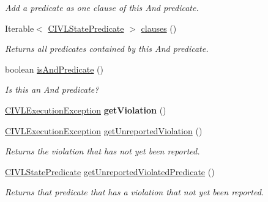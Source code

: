\begin{DoxyCompactItemize}
\begin{DoxyCompactList}\small\item\em Add a predicate as one clause of this And predicate. \end{DoxyCompactList}\item 
Iterable$<$ \hyperlink{interfaceedu_1_1udel_1_1cis_1_1vsl_1_1civl_1_1predicate_1_1IF_1_1CIVLStatePredicate}{C\+I\+V\+L\+State\+Predicate} $>$ \hyperlink{classedu_1_1udel_1_1cis_1_1vsl_1_1civl_1_1predicate_1_1common_1_1CommonAndPredicate_a1026db7b2a971331b41a0d5e1287c7d6}{clauses} ()
\begin{DoxyCompactList}\small\item\em Returns all predicates contained by this And predicate. \end{DoxyCompactList}\item 
boolean \hyperlink{classedu_1_1udel_1_1cis_1_1vsl_1_1civl_1_1predicate_1_1common_1_1CommonAndPredicate_a731ae5101c23f844402609dca417f9f3}{is\+And\+Predicate} ()
\begin{DoxyCompactList}\small\item\em Is this an And predicate? \end{DoxyCompactList}\item 
\hypertarget{classedu_1_1udel_1_1cis_1_1vsl_1_1civl_1_1predicate_1_1common_1_1CommonAndPredicate_aef11b4ccccec14cad4352d00757ed91a}{}\hyperlink{classedu_1_1udel_1_1cis_1_1vsl_1_1civl_1_1log_1_1IF_1_1CIVLExecutionException}{C\+I\+V\+L\+Execution\+Exception} {\bfseries get\+Violation} ()\label{classedu_1_1udel_1_1cis_1_1vsl_1_1civl_1_1predicate_1_1common_1_1CommonAndPredicate_aef11b4ccccec14cad4352d00757ed91a}

\item 
\hyperlink{classedu_1_1udel_1_1cis_1_1vsl_1_1civl_1_1log_1_1IF_1_1CIVLExecutionException}{C\+I\+V\+L\+Execution\+Exception} \hyperlink{classedu_1_1udel_1_1cis_1_1vsl_1_1civl_1_1predicate_1_1common_1_1CommonAndPredicate_ae2403ed301b8d77944272da499e8b258}{get\+Unreported\+Violation} ()
\begin{DoxyCompactList}\small\item\em Returns the violation that has not yet been reported. \end{DoxyCompactList}\item 
\hyperlink{interfaceedu_1_1udel_1_1cis_1_1vsl_1_1civl_1_1predicate_1_1IF_1_1CIVLStatePredicate}{C\+I\+V\+L\+State\+Predicate} \hyperlink{classedu_1_1udel_1_1cis_1_1vsl_1_1civl_1_1predicate_1_1common_1_1CommonAndPredicate_a2f2ba1e03f85fe86734d972d2320c13d}{get\+Unreported\+Violated\+Predicate} ()
\begin{DoxyCompactList}\small\item\em Returns that predicate that has a violation that not yet been reported. \end{DoxyCompactList}\end{DoxyCompactItemize}
